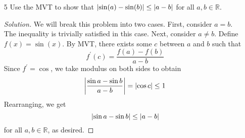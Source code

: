 \documentclass[12pt]{article}
\theoremstyle{definition}
\newenvironment{soln}{\begin{proof}[Solution]}{\end{proof}}
\begin{document}
\begin{enumerate}[leftmargin=*]
    \item[5] Use the MVT to show that $\abs{\sin(a) - \sin(b)} \leq \abs{a-b}$ for all $a,b \in \mathbb{R}$. 
    \begin{soln}
        We will break this problem into two cases. First, consider $a = b$. The inequality is trivially satisfied in this case. 
        Next, consider $a \neq b$. Define $f(x) = \sin(x)$. By MVT, there exists some $c$ between $a$ and $b$ such that
        \[
            f^{\prime}(c) = \frac{f(a) - f(b)}{a-b}
        \]
        Since $f^{\prime} = \cos$, we take modulus on both sides to obtain
        \[
            \abs{\frac{\sin a - \sin b}{a - b}} = \abs{\cos c} \leq 1
        \]  
        Rearranging, we get
        \[
            \abs{\sin a - \sin b} \leq \abs{a - b}
        \]
        for all $a,b \in \mathbb{R}$, as desired.
    \end{soln}
\end{enumerate}
\end{document}
